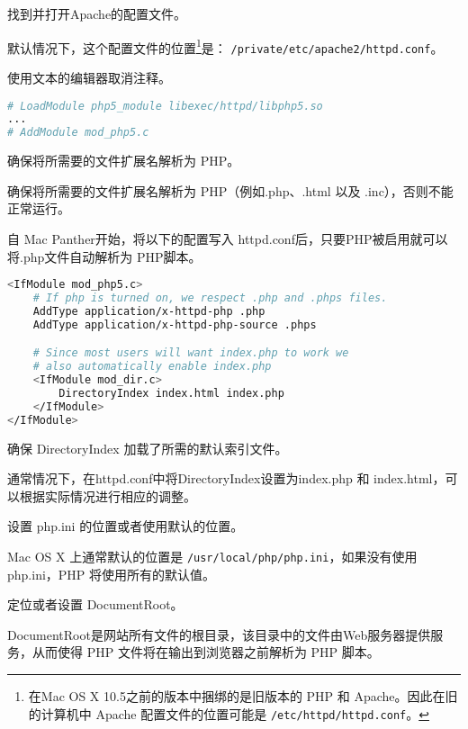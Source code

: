 \begin{compactenum}
\item 找到并打开Apache的配置文件。

默认情况下，这个配置文件的位置\footnote{在Mac OS X 10.5之前的版本中捆绑的是旧版本的 PHP 和 Apache。因此在旧的计算机中 Apache 配置文件的位置可能是 \texttt{/etc/httpd/httpd.conf}。}是： \texttt{/private/etc/apache2/httpd.conf}。 

\item 使用文本的编辑器取消注释。

\begin{lstlisting}[language=bash]
# LoadModule php5_module libexec/httpd/libphp5.so
...
# AddModule mod_php5.c
\end{lstlisting}

\item 确保将所需要的文件扩展名解析为 PHP。

确保将所需要的文件扩展名解析为 PHP（例如.php、.html 以及 .inc），否则不能正常运行。

自 Mac Panther开始，将以下的配置写入 httpd.conf后，只要PHP被启用就可以将.php文件自动解析为 PHP脚本。

\begin{lstlisting}[language=bash]
<IfModule mod_php5.c>
    # If php is turned on, we respect .php and .phps files.
    AddType application/x-httpd-php .php
    AddType application/x-httpd-php-source .phps

    # Since most users will want index.php to work we
    # also automatically enable index.php
    <IfModule mod_dir.c>
        DirectoryIndex index.html index.php
    </IfModule>
</IfModule>
\end{lstlisting}

\item 确保 DirectoryIndex 加载了所需的默认索引文件。

通常情况下，在httpd.conf中将DirectoryIndex设置为index.php 和 index.html，可以根据实际情况进行相应的调整。

\item 设置 php.ini 的位置或者使用默认的位置。

Mac OS X 上通常默认的位置是 \texttt{/usr/local/php/php.ini}，如果没有使用 php.ini，PHP 将使用所有的默认值。

\item 定位或者设置 DocumentRoot。

DocumentRoot是网站所有文件的根目录，该目录中的文件由Web服务器提供服务，从而使得 PHP 文件将在输出到浏览器之前解析为 PHP 脚本。


\end{compactenum}
